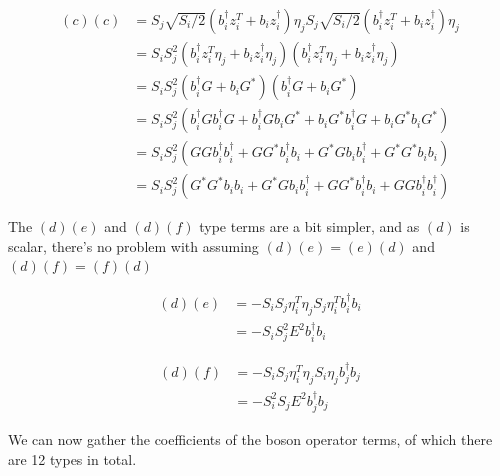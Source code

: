 \documentclass{article}
\begin{document}
\begin{align}
(c)(c) &= S_j \sqrt{S_i/2} \left(b_i^\dagger z_i^T + b_i z_i^\dagger \right) \eta_j S_j \sqrt{S_i/2} \left(b_i^\dagger z_i^T + b_i z_i^\dagger \right) \eta_j \\
&= S_i S_j^2 \left(b_i^\dagger z_i^T \eta_j + b_i z_i^\dagger \eta_j \right) \left(b_i^\dagger z_i^T \eta_j + b_i z_i^\dagger \eta_j \right) \\
&= S_i S_j^2 \left(b_i^\dagger G + b_i G^* \right) \left(b_i^\dagger G + b_i G^* \right) \\
&= S_i S_j^2 \left(
b_i^\dagger G b_i^\dagger G +
b_i^\dagger G b_i G^* +
b_i G^* b_i^\dagger G +
b_i G^* b_i G^*
\right) \\
&= S_i S_j^2 \left(
G G b_i^\dagger b_i^\dagger +
G G^* b_i^\dagger b_i +
G^* G b_i b_i^\dagger +
G^* G^* b_i b_i
\right) \\
&= S_i S_j^2 \left(
G^* G^* b_i b_i +
G^* G b_i b_i^\dagger +
G G^* b_i^\dagger b_i +
G G b_i^\dagger b_i^\dagger
\right)
\end{align}

The $(d)(e)$ and $(d)(f)$ type terms are a bit simpler, and as $(d)$ is scalar, there's no problem with
assuming $(d)(e) = (e)(d)$ and $(d)(f) = (f)(d)$

\begin{align}
(d)(e) &= -S_i S_j\eta_i^T \eta_j S_j \eta_i^T b_i^\dagger b_i \\
&= -S_i S_j^2 E^2 b^\dagger_i b_i
\end{align}

\begin{align}
(d)(f) &= -S_i S_j\eta_i^T \eta_j S_i \eta_j b_j^\dagger b_j\\
&= -S_i^2 S_j E^2 b^\dagger_j b_j
\end{align}

We can now gather the coefficients of the boson operator terms, of which there are 12 types in total.
\end{document}

